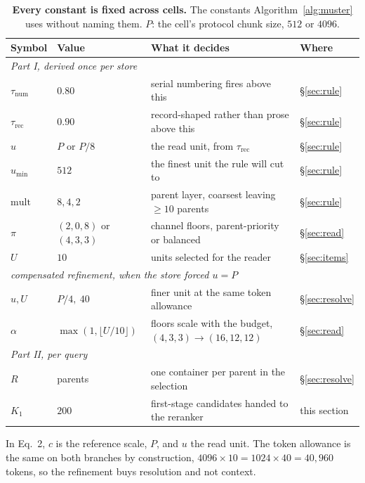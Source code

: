 \documentclass{article}
\newcommand{\tabfont}{\fontsize{7.5}{8.5}\selectfont\renewcommand{\arraystretch}{1.0}}
\begin{document}
\begin{table}[H]
\centering\tabfont
\caption{\textbf{Every constant is fixed across cells.} The constants Algorithm~\ref{alg:muster} uses without naming them. $P$: the cell's protocol chunk size, $512$ or $4096$.}
\label{tab:hyper}
\setlength{\tabcolsep}{5pt}
\begin{tabular}{llll}
\toprule
Symbol & Value & What it decides & Where \\
\midrule
\multicolumn{4}{l}{\emph{Part I, derived once per store}}\\
$\tau_{\mathrm{num}}$ & $0.80$ & serial numbering fires above this & \S\ref{sec:rule}\\
$\tau_{\mathrm{rec}}$ & $0.90$ & record-shaped rather than prose above this & \S\ref{sec:rule}\\
$u$ & $P$ or $P/8$ & the read unit, from $\tau_{\mathrm{rec}}$ & \S\ref{sec:rule}\\
$u_{\min}$ & $512$ & the finest unit the rule will cut to & \S\ref{sec:rule}\\
$\mathrm{mult}$ & $8, 4, 2$ & parent layer, coarsest leaving $\ge\!10$ parents & \S\ref{sec:rule}\\
$\pi$ & $(2,0,8)$ or $(4,3,3)$ & channel floors, parent-priority or balanced & \S\ref{sec:read}\\
$U$ & $10$ & units selected for the reader & \S\ref{sec:items}\\
\multicolumn{4}{l}{\emph{compensated refinement, when the store forced $u=P$}}\\
$u, U$ & $P/4,\ 40$ & finer unit at the same token allowance & \S\ref{sec:resolve}\\
$\alpha$ & $\max(1,\lfloor U/10\rfloor)$ & floors scale with the budget, $(4,3,3)\!\to\!(16,12,12)$ & \S\ref{sec:read}\\
\multicolumn{4}{l}{\emph{Part II, per query}}\\
$R$ & parents & one container per parent in the selection & \S\ref{sec:resolve}\\
$K_1$ & $200$ & first-stage candidates handed to the reranker & this section\\
\bottomrule
\end{tabular}
\end{table}

In Eq.~2, $c$ is the reference scale, $P$, and $u$ the read unit. The token allowance is the same on both branches by construction, $4096{\times}10 = 1024{\times}40 =
40{,}960$ tokens, so the refinement buys resolution and not context.
\end{document}
